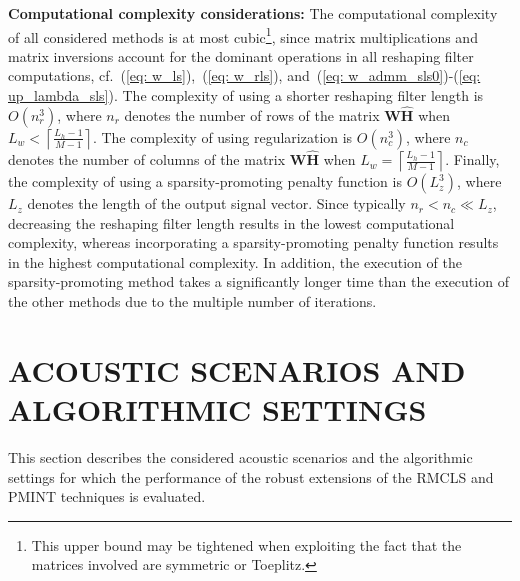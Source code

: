 \documentclass[fleqn]{aes2e}
\begin{document}
\vskip 2pt
\textbf{Computational complexity considerations:} \enspace The computational complexity of all considered methods is at most cubic\footnote{This upper bound may be tightened when exploiting the fact that the matrices involved are symmetric or Toeplitz.}, since matrix multiplications and matrix inversions account for the dominant operations in all reshaping filter computations, cf.~(\ref{eq: w_ls}),~(\ref{eq: w_rls}), and~(\ref{eq: w_admm_sls0})-(\ref{eq: up_lambda_sls}).
The complexity of using a shorter reshaping filter length is $O(n_r^3)$, where $n_r$ denotes the number of rows of the matrix $\mathbf{W}\hat{\mathbf{H}}$ when $L_w < \left\lceil{\frac{L_h-1}{M-1}}\right\rceil$.
The complexity of using regularization is $O(n_c^3)$, where $n_c$ denotes the number of columns of the matrix $\mathbf{W}\hat{\mathbf{H}}$ when $L_w = \left\lceil{\frac{L_h-1}{M-1}}\right\rceil$.
Finally, the complexity of using a sparsity-promoting penalty function is $O(L_z^3)$, where $L_z$ denotes the length of the output signal vector. 
Since typically $n_r < n_c \ll L_z$, decreasing the reshaping filter length results in the lowest computational complexity, whereas incorporating a sparsity-promoting penalty function results in the highest computational complexity.
In addition, the execution of the sparsity-promoting method takes a significantly longer time than the execution of the other methods due to the multiple number of iterations. 

\section{ACOUSTIC SCENARIOS AND ALGORITHMIC SETTINGS}
\label{sec: exp}

This section describes the considered acoustic scenarios and the algorithmic settings for which the performance of the robust extensions of the RMCLS and PMINT techniques is evaluated.
\end{document}
